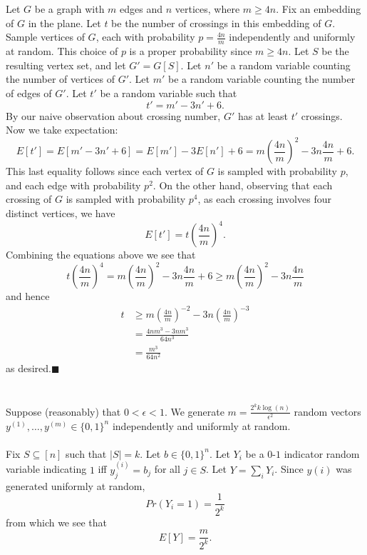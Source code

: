 \documentclass[letterpaper,12pt,oneside,onecolumn]{article}
\begin{document}
\section{}
\paragraph{}
Let $G$ be a graph with $m$ edges and $n$ vertices, where $m \geq 4n$. Fix an embedding of $G$ in the plane. Let $t$ be the number of crossings in this embedding of $G$. Sample vertices of $G$, each with probability $p=\frac{4n}{m}$ independently and uniformly at random. This choice of $p$ is a proper probability since $m \geq 4n$.  Let $S$ be the resulting vertex set, and let $G' = G[S]$. Let $n'$ be a random variable counting the number of vertices of $G'$. Let $m'$ be a random variable counting the number of edges of $G'$. Let $t'$ be a random variable such that
$$t' = m' - 3n'+ 6.$$
By our naive observation about crossing number, $G'$ has at least $t'$ crossings. Now we take expectation:
$$E[t'] = E[m' -3n' + 6] = E[m'] -3E[n'] + 6 = m(\frac{4n}{m})^2 -3n\frac{4n}{m} +6.$$
This last equality follows since each vertex of $G$ is sampled with probability $p$, and each edge with probability $p^2$. On the other hand, observing that each crossing of $G$ is sampled with probability $p^4$, as each crossing involves four distinct vertices, we have
$$E[t'] = t(\frac{4n}{m})^4.$$
Combining the equations above we see that
$$ t(\frac{4n}{m})^4 = m(\frac{4n}{m})^2 -3n\frac{4n}{m} +6 \geq m(\frac{4n}{m})^2 -3n\frac{4n}{m}$$
and hence
\begin{align*}
t &\geq m(\frac{4n}{m})^{-2} -3n(\frac{4n}{m})^{-3} \\
&=\frac{4nm^3 - 3nm^3}{64n^3}\\
&= \frac{m^3}{64n^2}
\end{align*}
as desired.$\blacksquare$
\newpage
\section{}
\paragraph{}
Suppose (reasonably) that $0 < \epsilon < 1$. We generate $m = \frac{2^kk\log(n)}{\epsilon^2}$ random vectors $y^{(1)}, \dots, y^{(m)} \in \{0,1\}^n$ independently and uniformly at random. 
\paragraph{}
Fix $S\subseteq [n]$ such that $|S|=k$. Let $b \in \{0,1\}^n$. Let $Y_i$ be a $0$-$1$ indicator random variable indicating $1$ iff $y^{(i)}_j = b_j$ for all $j \in S$. Let $Y = \sum_{i} Y_i$. Since $y(i)$ was generated uniformly at random, 
$$Pr(Y_i = 1) = \frac{1}{2^k}$$
from which we see that
$$E[Y] = \frac{m}{2^k}.$$
\end{document}
